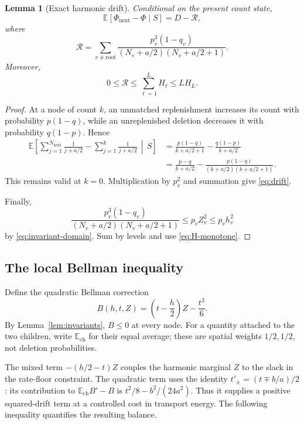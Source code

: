 \documentclass[11pt]{article}
\numberwithin{equation}{section}
\newtheorem{lemma}[theorem]{Lemma}
\theoremstyle{remark}
\newcommand{\E}{\mathbb E}
\begin{document}
\begin{lemma}[Exact harmonic drift]\label{lem:drift}
Conditional on the present count state,
\begin{equation}\label{eq:drift}
\E[\Phi_{\mathrm{next}}-\Phi\mid S]=D-\mathcal R,
\end{equation}
where
\begin{equation}\label{eq:curvature-error}
\mathcal R=
\sum_{v\ne\mathrm{root}}
\frac{p_v^3(1-q_v)}{(N_v+a/2)(N_v+a/2+1)}.
\end{equation}
Moreover,
\begin{equation}\label{eq:R-bound}
0\le\mathcal R\le\sum_{\ell=1}^L H_\ell\le LH_L.
\end{equation}
\end{lemma}
\begin{proof}
At a node of count \(k\), an unmatched replenishment increases its count
with probability \(p(1-q)\), while an unreplenished deletion decreases it
with probability \(q(1-p)\). Hence
\begin{align*}
\E\left[
\sum_{j=1}^{N_{\mathrm{next}}}\frac1{j+a/2}
-\sum_{j=1}^{k}\frac1{j+a/2}
\,\middle|\,S\right]
&=\frac{p(1-q)}{k+a/2+1}-\frac{q(1-p)}{k+a/2}\\
&=\frac{p-q}{k+a/2}
-\frac{p(1-q)}{(k+a/2)(k+a/2+1)}.
\end{align*}
This remains valid at \(k=0\). Multiplication by \(p_v^2\) and summation
give \eqref{eq:drift}.

Finally,
\[
\frac{p_v^3(1-q_v)}{(N_v+a/2)(N_v+a/2+1)}
\le p_vZ_v^2\le p_vh_v^2
\]
by \eqref{eq:invariant-domain}. Sum by levels and use
\eqref{eq:H-monotone}.
\end{proof}


\subsection{The local Bellman inequality}

Define the quadratic Bellman correction
\begin{equation}\label{eq:Bellman}
B(h,t,Z)=\left(t-\frac h2\right)Z-\frac{t^2}{6}.
\end{equation}
By Lemma~\ref{lem:invariants}, \(B\le0\) at every node.
For a quantity attached to the two children, write
\(\E_{\mathrm{ch}}\) for their equal average; these are spatial weights
\(1/2,1/2\), not deletion probabilities.

The mixed term \(-(h/2-t)Z\) couples the harmonic marginal \(Z\) to
the slack in the rate-floor constraint. The quadratic term uses the
identity \(t'_\pm=(t\mp b/a)/2\): its contribution to
\(\E_{\mathrm{ch}}B'-B\) is \(t^2/8-b^2/(24a^2)\).
Thus it supplies a positive squared-drift term at a controlled cost in
transport energy. The following inequality quantifies the resulting
balance.
\end{document}
